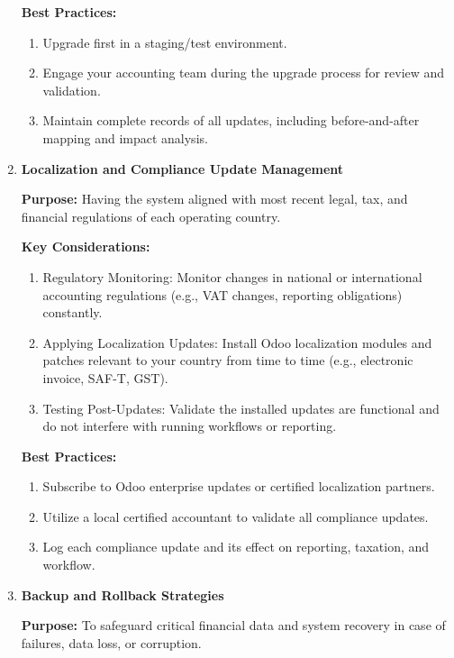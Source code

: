 \documentclass[11pt,a4paper]{article}
\begin{document}
\begin{enumerate}
\medskip
\textbf{Best Practices:}
\begin{enumerate}
    \item Upgrade first in a staging/test environment.
    \item Engage your accounting team during the upgrade process for review and validation.
    \item Maintain complete records of all updates, including before-and-after mapping and impact 
	analysis.
\end{enumerate}

    \item \textbf{Localization and Compliance Update Management}

    \textbf{Purpose:} Having the system aligned with most recent legal, tax, and financial regulations of each operating country.

    \textbf{Key Considerations:}
    \begin{enumerate}
        \item Regulatory Monitoring: Monitor changes in national or international accounting regulations (e.g., VAT changes, reporting obligations) constantly.
        \item Applying Localization Updates: Install Odoo localization modules and patches relevant to your country from time to time (e.g., electronic invoice, SAF-T, GST).
        \item Testing Post-Updates: Validate the installed updates are functional and do not interfere with running workflows or reporting.
    \end{enumerate}

    \textbf{Best Practices:}
    \begin{enumerate}
        \item Subscribe to Odoo enterprise updates or certified localization partners.
        \item Utilize a local certified accountant to validate all compliance updates.
        \item Log each compliance update and its effect on reporting, taxation, and workflow.
    \end{enumerate}
    
    \item \textbf{Backup and Rollback Strategies}
    
    \begin{minipage}{0.45\textwidth}
    \textbf{Purpose:} To safeguard critical financial data and system recovery in case of failures, data loss, or corruption.
    

\end{minipage}
\end{enumerate}
\end{document}
